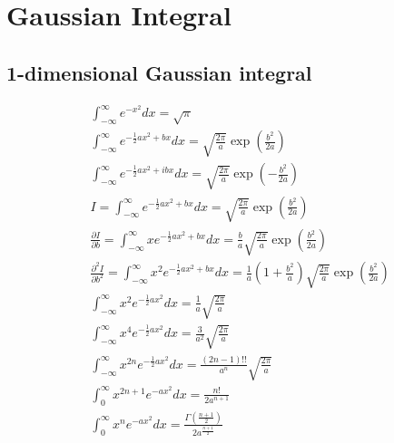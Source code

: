 \chapter{Gaussian Integral}
\section*{1-dimensional Gaussian integral}
\begin{center}
    \begin{equation*}
        \begin{aligned}
            &\int_{-\infty}^{\infty} e^{-x^{2}} d x=\sqrt{\pi}\\
            &\int_{-\infty}^{\infty} e^{-\frac{1}{2} a x^{2}+b x} d x=\sqrt{\frac{2 \pi}{a}} \exp \left(\frac{b^{2}}{2 a}\right)\\
            &\int_{-\infty}^{\infty} e^{-\frac{1}{2} a x^{2}+i b x} d x=\sqrt{\frac{2 \pi}{a}} \exp \left(-\frac{b^{2}}{2 a}\right)\\
            &I=\int_{-\infty}^{\infty} e^{-\frac{1}{2} a x^{2}+b x} d x=\sqrt{\frac{2 \pi}{a}} \exp \left(\frac{b^{2}}{2 a}\right)\\
            &\frac{\partial I}{\partial b}=\int_{-\infty}^{\infty} x e^{-\frac{1}{2} a x^{2}+b x} d x=\frac{b}{a} \sqrt{\frac{2 \pi}{a}} \exp \left(\frac{b^{2}}{2 a}\right)\\
            &\frac{\partial^{2} I}{\partial b^{2}}=\int_{-\infty}^{\infty} x^{2} e^{-\frac{1}{2} a x^{2}+b x} d x=\frac{1}{a}\left(1+\frac{b^{2}}{a}\right) \sqrt{\frac{2 \pi}{a}} \exp \left(\frac{b^{2}}{2 a}\right)\\
            &\int_{-\infty}^{\infty} x^{2} e^{-\frac{1}{2} a x^{2}} d x=\frac{1}{a} \sqrt{\frac{2 \pi}{a}}\\
            &\int_{-\infty}^{\infty} x^{4} e^{-\frac{1}{2} a x^{2}} d x=\frac{3}{a^{2}} \sqrt{\frac{2 \pi}{a}}\\
            &\int_{-\infty}^{\infty} x^{2 n} e^{-\frac{1}{2} a x^{2}} d x=\frac{(2 n-1) ! !}{a^{n}} \sqrt{\frac{2 \pi}{a}}\\
            &\int_{0}^{\infty} x^{2 n+1} e^{-a x^{2}} d x=\frac{n !}{2 a^{n+1}}\\
            &\int_{0}^{\infty} x^{n} e^{-a x^{2}} d x=\frac{\Gamma\left(\frac{n+1}{2}\right)}{2 a^{\frac{n+1}{2}}}
        \end{aligned}
    \end{equation*}
\end{center}
